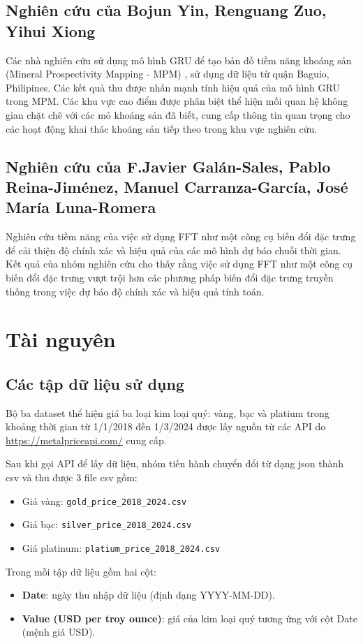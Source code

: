 \documentclass[conference]{IEEEtran}
\begin{document}
\subsection{Nghiên cứu của Bojun Yin, Renguang Zuo, Yihui Xiong}
Các nhà nghiên cứu sử dụng mô hình GRU để tạo bản đồ tiềm năng khoáng sản (Mineral Prospectivity Mapping - MPM) , sử dụng dữ liệu từ quận Baguio, Philipines. Các kết quả thu được nhấn mạnh tính hiệu quả của mô hình GRU trong MPM. Các khu vực cao điểm được phân biệt thể hiện mối quan hệ không gian chặt chẽ với các mỏ khoáng sản đã biết, cung cấp thông tin quan trọng cho các hoạt động khai thác khoáng sản tiếp theo trong khu vực nghiên cứu. 
\subsection{Nghiên cứu của F.Javier Galán-Sales, Pablo Reina-Jiménez, Manuel Carranza-García, José María Luna-Romera}
Nghiên cứu tiềm năng của việc sử dụng FFT như một công cụ biến đổi đặc trưng để cải thiện độ chính xác và hiệu quả của các mô hình dự báo chuỗi thời gian. Kết quả của nhóm nghiên cứu cho thấy rằng việc sử dụng FFT như một công cụ biến đổi đặc trưng vượt trội hơn các phương pháp biến đổi đặc trưng truyền thống trong việc dự báo độ chính xác và hiệu quả tính toán.
\section{Tài nguyên} 

\subsection{Các tập dữ liệu sử dụng }\label{AA}
Bộ ba dataset thể hiện giá ba loại kim loại quý: vàng, bạc và platium trong khoảng thời gian từ 1/1/2018 đến 1/3/2024 được lấy nguồn từ các API do \url{https://metalpriceapi.com/} cung cấp. 

Sau khi gọi API để lấy dữ liệu, nhóm tiến hành chuyển đổi từ dạng json thành csv và thu được 3 file csv gồm: 
\begin{itemize}
    \item Giá vàng: \texttt{gold\_price\_2018\_2024.csv}
    \item Giá bạc: \texttt{silver\_price\_2018\_2024.csv}
    \item Giá platinum: \texttt{platium\_price\_2018\_2024.csv}
\end{itemize}
Trong mỗi tập dữ liệu gồm hai cột: 
\begin{itemize}
    \item \textbf{Date}: ngày thu nhập dữ liệu (định dạng YYYY-MM-DD).  
    \item \textbf{Value (USD per troy ounce)}: giá của kim loại quý tương ứng với cột Date (mệnh giá USD).
\end{itemize} 
\end{document}

